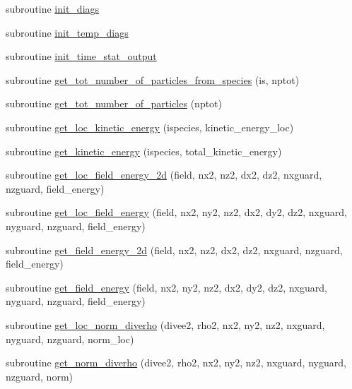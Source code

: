 \begin{DoxyCompactItemize}
\item 
subroutine \hyperlink{namespacediagnostics_a090bf3606a7c0c889195bd01b10adc5c}{init\+\_\+diags}
\item 
subroutine \hyperlink{namespacediagnostics_a111912cfff0906f9e78449119c1a3e43}{init\+\_\+temp\+\_\+diags}
\item 
subroutine \hyperlink{namespacediagnostics_a3ccd1d3efa537c9c73cbca0141184c32}{init\+\_\+time\+\_\+stat\+\_\+output}
\item 
subroutine \hyperlink{namespacediagnostics_a00e54b5beba626e955d8e3e946962f1d}{get\+\_\+tot\+\_\+number\+\_\+of\+\_\+particles\+\_\+from\+\_\+species} (is, nptot)
\item 
subroutine \hyperlink{namespacediagnostics_ab628191e427157162f167691267d0d1f}{get\+\_\+tot\+\_\+number\+\_\+of\+\_\+particles} (nptot)
\item 
subroutine \hyperlink{namespacediagnostics_addf30cc7cc0a935993be10cbf8b017f5}{get\+\_\+loc\+\_\+kinetic\+\_\+energy} (ispecies, kinetic\+\_\+energy\+\_\+loc)
\item 
subroutine \hyperlink{namespacediagnostics_ab51517b8d0751b8e43e0ab3c9338af41}{get\+\_\+kinetic\+\_\+energy} (ispecies, total\+\_\+kinetic\+\_\+energy)
\item 
subroutine \hyperlink{namespacediagnostics_a26be0942bfb3d70876815b6e121dec1c}{get\+\_\+loc\+\_\+field\+\_\+energy\+\_\+2d} (field, nx2, nz2, dx2, dz2, nxguard, nzguard, field\+\_\+energy)
\item 
subroutine \hyperlink{namespacediagnostics_a00b7e2217883d1cfe260ccc24e740663}{get\+\_\+loc\+\_\+field\+\_\+energy} (field, nx2, ny2, nz2, dx2, dy2, dz2, nxguard, nyguard, nzguard, field\+\_\+energy)
\item 
subroutine \hyperlink{namespacediagnostics_a35743d1121d2d5381a758ad94085362e}{get\+\_\+field\+\_\+energy\+\_\+2d} (field, nx2, nz2, dx2, dz2, nxguard, nzguard, field\+\_\+energy)
\item 
subroutine \hyperlink{namespacediagnostics_ac039b5b8f68cf780a761ee735024fe56}{get\+\_\+field\+\_\+energy} (field, nx2, ny2, nz2, dx2, dy2, dz2, nxguard, nyguard, nzguard, field\+\_\+energy)
\item 
subroutine \hyperlink{namespacediagnostics_a1a35a5a833c5e6c91cf6bc2f3d371d6a}{get\+\_\+loc\+\_\+norm\+\_\+diverho} (divee2, rho2, nx2, ny2, nz2, nxguard, nyguard, nzguard, norm\+\_\+loc)
\item 
subroutine \hyperlink{namespacediagnostics_a39c7463e667e97124ccb0c85381e6d03}{get\+\_\+norm\+\_\+diverho} (divee2, rho2, nx2, ny2, nz2, nxguard, nyguard, nzguard, norm)
\end{DoxyCompactItemize}


